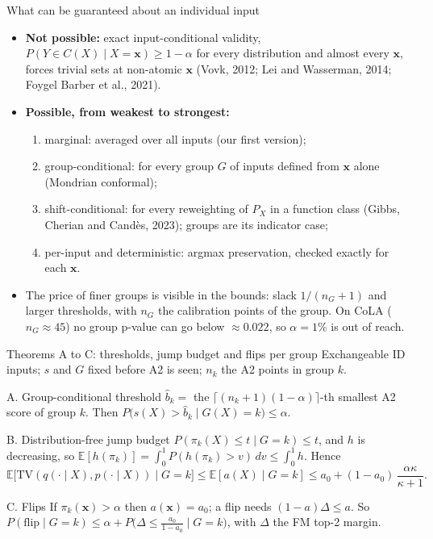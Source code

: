 \documentclass[aspectratio=169,11pt]{beamer}
\newcommand{\E}{\mathbb{E}}
\newcommand{\x}{\bm{x}}
\begin{document}
\begin{frame}{What can be guaranteed about an individual input}
  \small
  \begin{itemize}
    \item \textbf{Not possible:} exact input-conditional validity, $P(Y\in C(X)\mid X=\x)\ge1-\alpha$ for every distribution and almost every $\x$, forces trivial sets at non-atomic $\x$ (Vovk, 2012; Lei and Wasserman, 2014; Foygel Barber et al., 2021).
    \item \textbf{Possible, from weakest to strongest:}
      \begin{enumerate}
        \item marginal: averaged over all inputs (our first version);
        \item group-conditional: for every group $G$ of inputs defined from $\x$ alone (Mondrian conformal);
        \item shift-conditional: for every reweighting of $P_X$ in a function class (Gibbs, Cherian and Cand\`es, 2023); groups are its indicator case;
        \item per-input and deterministic: argmax preservation, checked exactly for each $\x$.
      \end{enumerate}
    \item The price of finer groups is visible in the bounds: slack $1/(n_G+1)$ and larger thresholds, with $n_G$ the calibration points of the group. On CoLA ($n_G\approx45$) no group p-value can go below $\approx0.022$, so $\alpha=1\%$ is out of reach.
  \end{itemize}
\end{frame}

\begin{frame}{Theorems A to C: thresholds, jump budget and flips per group}
  \small
  Exchangeable ID inputs; $s$ and $G$ fixed before A2 is seen; $n_k$ the A2 points in group $k$.
  \begin{block}{A. Group-conditional threshold}
    $\hat b_k=$ the $\lceil(n_k+1)(1-\alpha)\rceil$-th smallest A2 score of group $k$. Then $P\big(s(X)>\hat b_k\mid G(X)=k\big)\le\alpha$.
  \end{block}
  \begin{block}{B. Distribution-free jump budget}
    $P(\pi_k(X)\le t\mid G=k)\le t$, and $h$ is decreasing, so $\E[h(\pi_k)]=\int_0^1P(h(\pi_k)>v)\,dv\le\int_0^1h$. Hence
    \[ \E\big[\mathrm{TV}(q(\cdot\mid X),p(\cdot\mid X))\mid G=k\big]\le\E[a(X)\mid G=k]\le a_0+(1-a_0)\,\frac{\alpha\kappa}{\kappa+1}. \]
  \end{block}
  \begin{block}{C. Flips}
    If $\pi_k(\x)>\alpha$ then $a(\x)=a_0$; a flip needs $(1-a)\Delta\le a$. So $P(\text{flip}\mid G=k)\le\alpha+P\big(\Delta\le\frac{a_0}{1-a_0}\mid G=k\big)$, with $\Delta$ the FM top-2 margin.
  \end{block}
\end{frame}
\end{document}

